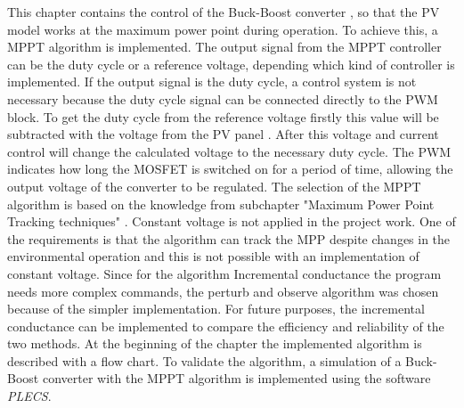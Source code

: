 This chapter contains the control of the Buck-Boost converter , so that the PV model works at the maximum power point during operation. To achieve this, a MPPT algorithm is implemented. The output signal from the MPPT controller can be the duty cycle or a reference voltage, depending which kind of controller is implemented. If the output signal is the duty cycle, a control system is not necessary because the duty cycle signal can be connected directly to the PWM block. To get the duty cycle from the reference voltage firstly this value will be subtracted with the voltage from the PV panel . After this voltage and current control will change the calculated voltage to the necessary duty cycle. The PWM indicates how long the MOSFET is switched on for a period of time, allowing the output voltage of the converter to be regulated.
The selection of the MPPT algorithm is based on the knowledge from subchapter "Maximum Power Point Tracking techniques" .
Constant voltage is not applied in the project work. One of the requirements is that the algorithm can track the MPP despite changes in the environmental operation and this is not possible with an implementation of constant voltage. Since for the algorithm Incremental conductance the program needs more complex commands, the perturb and observe algorithm was chosen because of the simpler implementation. For future purposes, the incremental conductance can be implemented to compare the efficiency and reliability of the two methods.
At the beginning of the chapter the implemented algorithm is described with a flow chart. To validate the algorithm, a simulation of a Buck-Boost converter with the MPPT algorithm is implemented using the software \textit{PLECS}. 
